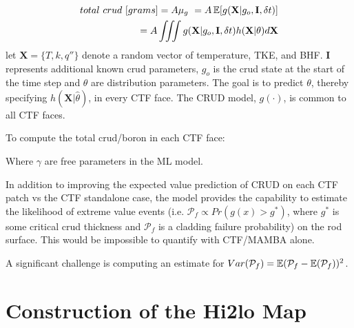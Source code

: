 \begin{eqnarray}
        total\ crud\ [grams] = A \mu_g\ = A \operatorname*{\mathbb{E}}[g(\mathbf X|g_o, \mathbf I, \delta t)] \nonumber \\
        = A \iiint g(\mathbf X|g_o, \mathbf I, \delta t) h(\mathbf X|\theta) d \mathbf X
        \label{eq:expected_crud}
\end{eqnarray}
let $\mathbf X= \{T, k, q''\}$ denote a random vector of temperature, TKE, and BHF. $\mathbf I$ represents additional known crud parameters, $g_o$ is the crud state at the start of the time step and $\theta$ are distribution parameters.  The goal is to predict $\theta$, thereby specifying $h(\mathbf X|\hat \theta)$, in every CTF face.  The CRUD model, $g(\cdot)$, is common to all CTF faces.

To compute the total crud/boron in each CTF face:
\\

\begin{algorithm}[H]

\end{algorithm}
Where $\gamma$ are free parameters in the ML model.
\bigskip

In addition to improving the expected value prediction of CRUD on each CTF patch vs the CTF standalone case, the model provides the capability to estimate the likelihood of extreme value events (i.e. $\mathcal P_f \propto Pr(g(x) > g^*)$, where $g^*$ is some critical crud thickness and $\mathcal P_f$ is a cladding failure probability) on the rod surface.  This would be impossible to quantify with CTF/MAMBA alone.

A significant challenge is computing an estimate for $Var(\mathcal P_f) = \operatorname*{\mathbb{E}}(\mathcal P_f - \operatorname*{\mathbb{E}}(\mathcal P_f))^2$.


\section{Construction of the Hi2lo Map}

